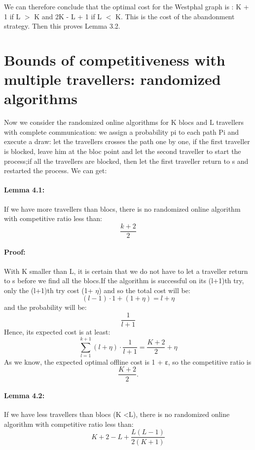 \documentclass[a4paper, 10pt]{article}
\begin{document}
We can therefore conclude that the optimal cost for the Westphal graph is : K + 1 if L $>$ K and 2K - L + 1 if L $<$ K. This is the cost of the abandonment strategy. Then this proves Lemma 3.2.


\section{Bounds of competitiveness with multiple travellers: randomized algorithms}

Now we consider the randomized online algorithms for K blocs and L travellers with complete communication: we assign a probability pi to each path Pi and execute a draw: let the travellers crosses the path one by one, if the first traveller is blocked, leave him at the bloc point and let the second traveller to start the process;if all the travellers are blocked, then let the first traveller return to s and restarted the process. 
We can get:

\paragraph{Lemma 4.1:}If we have more travellers than blocs, there is no randomized online algorithm with competitive ratio less than:
\[
\frac{k+2}{2}
\]

\paragraph{Proof:} With K smaller than L, it is certain that we do not have to let a traveller return to s before we find all the blocs.If the algorithm is successful on its (l+1)th try, only the (l+1)th try cost (1+ $\eta$) and so the total cost will be:
\[
(l-1)\cdot 1 + (1+\eta) = l+\eta
\]
and the probability will be: 
\[
\frac{1}{l+1}
\]
Hence, its expected cost is at least:
\begin{displaymath}
\sum_{l=1}^{k+1}(l+\eta)\cdot \frac{1}{l+1} = \frac{K+2}{2}+\eta
\end{displaymath}
As we know, the expected optimal offline cost is 1 + ε, so the competitive ratio is 
\[
\frac{K+2}{2}.
\]

\paragraph{Lemma 4.2:}If we have less travellers than blocs (K \textless  L), there is no randomized online algorithm with competitive ratio less than:
\[
K+2-L+ \frac{L(L-1)}{2(K+1)}
\]
\end{document}
